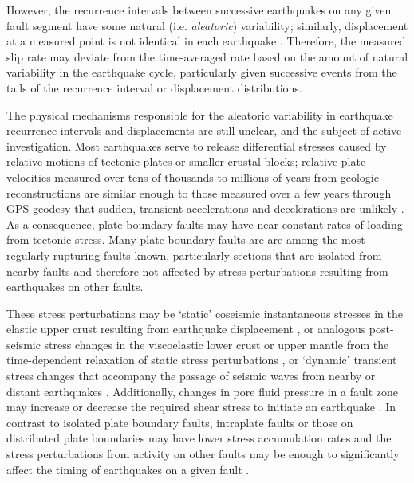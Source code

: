 \documentclass[se, manuscript]{copernicus}
\begin{document}
However, the recurrence intervals between successive earthquakes on any
given fault segment have some natural (i.e. \emph{aleatoric})
variability; similarly, displacement at a measured point is not
identical in each earthquake \citep[e.g.,][]{duross_holocene_2008}.
Therefore, the measured slip rate may deviate from the time-averaged
rate based on the amount of natural variability in the earthquake cycle,
particularly given successive events from the tails of the recurrence
interval or displacement distributions.

The physical mechanisms responsible for the aleatoric variability in earthquake 
recurrence intervals and displacements are still unclear, and the subject of 
active investigation. Most earthquakes serve to release differential stresses 
caused by relative motions of tectonic plates or smaller crustal blocks; 
relative plate velocities measured over tens of thousands to millions of years 
from geologic reconstructions are similar enough to those measured over a few 
years through GPS geodesy that sudden, transient accelerations and 
decelerations are unlikely \citep[e.g.,][]{demets_new_1999}. As a consequence, 
plate boundary faults may have near-constant rates of loading from tectonic 
stress. Many plate boundary faults are are among the most regularly-rupturing 
faults known, particularly sections that are isolated from nearby faults 
\citep[e.g.,][]{berryman_major_2012} and therefore not affected by stress 
perturbations resulting from earthquakes on other faults. 

These stress perturbations may be `static' coseismic instantaneous stresses in 
the elastic upper crust resulting from earthquake displacement 
\citep{king_static_1994}, or analogous post-seismic stress changes in the 
viscoelastic lower crust or upper mantle from the time-dependent relaxation of 
static stress perturbations \citep[e.g.,][]{chery_postseismic_2001}, or 
`dynamic' transient stress changes that accompany the passage of seismic waves 
from nearby or distant earthquakes \citep{gomberg_dynamic_2005}.  Additionally, 
changes in pore fluid pressure in a fault zone may increase or decrease the 
required shear stress to initiate an earthquake 
\citep{steacy_introduction_2005}. In contrast to isolated plate boundary 
faults, intraplate faults or those on distributed plate boundaries may have 
lower stress accumulation rates and the stress perturbations from activity on 
other faults may be enough to significantly affect the timing of earthquakes on 
a given fault \citep{gomberg_time-dependent_2005}. 
\end{document}
